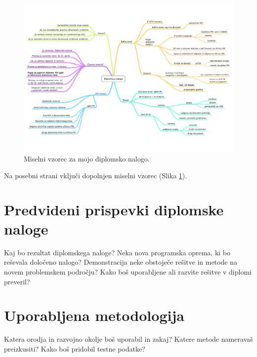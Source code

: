 \documentclass[11pt,a4paper]{article}
\begin{document}
\begin{figure}[p]
\centerline{\includegraphics[height=1.0\textwidth, angle=90]{mindmap.pdf}}
\caption{Miselni vzorec za mojo diplomsko nalogo.}
\label{sl:mindmap}
\end{figure}

Na posebni strani vključi dopolnjen miselni vzorec (Slika \ref{sl:mindmap}).



\section{Predvideni prispevki diplomske naloge}

Kaj bo rezultat diplomskega naloge? 
Neka nova programska oprema, ki bo reševala določeno nalogo?
Demonstracija neke obstoječe rešitve in metode na novem problemskem področju? 
Kako boš uporabljene ali razvite rešitve v diplomi preveril?


\section{Uporabljena metodologija}

Katera orodja in razvojno okolje boš uporabil in zakaj? 
Katere metode nameravaš preizkusiti?
Kako boš pridobil testne podatke?
\end{document}
